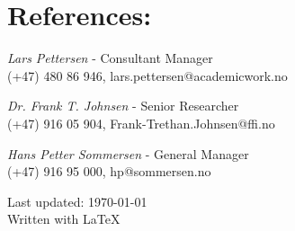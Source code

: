 \documentclass[letterpaper]{article}
\def\footerlink{}
\renewenvironment{itemize}{
  \begin{list}{}{
    \setlength{\leftmargin}{1.2em}
  }
}{
  \end{list}
}
\begin{document}
\section*{References:}
\begin{itemize}
    \item[Academic Work :] \textit{Lars Pettersen} - Consultant Manager 
	\\(+47) 480 86 946, lars.pettersen@academicwork.no

    \item[FFI :] \textit{Dr. Frank T. Johnsen} - Senior Researcher
	\\(+47) 916 05 904, Frank-Trethan.Johnsen@ffi.no

    \item[iNic :] \textit{Hans Petter Sommersen} - General Manager
	\\(+47) 916 95 000, hp@sommersen.no

\end{itemize}


\bigskip

\begin{center}
  \begin{footnotesize}
    Last updated: \today \\
    \href{\footerlink}{\texttt{\footerlink}} Written with \LaTeX
  \end{footnotesize}
\end{center}
\end{document}
